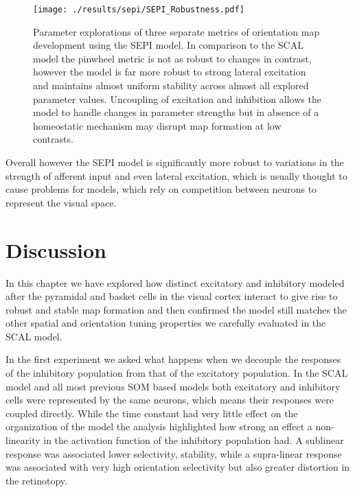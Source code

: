 \begin{figure}
	\centering
        \texttt{[image: ./results/sepi/SEPI\_Robustness.pdf]}
	\caption{Parameter explorations of three separate metrics of
          orientation map development using the SEPI model. In
          comparison to the SCAL model the pinwheel metric is not as
          robust to changes in contrast, however the model is far more
          robust to strong lateral excitation and maintains almost
          uniform stability across almost all explored parameter
          values. Uncoupling of excitation and inhibition allows the
          model to handle changes in parameter strengths but in
          absence of a homeostatic mechanism may disrupt map formation
          at low contrasts.}
	\label{SEPIStability}
\end{figure}

Overall however the SEPI model is significantly more robust to
variations in the strength of afferent input and even lateral
excitation, which is usually thought to cause problems for models,
which rely on competition between neurons to represent the visual
space.

\section{Discussion}

In this chapter we have explored how distinct excitatory and
inhibitory modeled after the pyramidal and basket cells in the visual
cortex interact to give rise to robust and stable map formation and
then confirmed the model still matches the other spatial and
orientation tuning properties we carefully evaluated in the SCAL
model.

In the first experiment we asked what happens when we decouple the
responses of the inhibitory population from that of the excitatory
population. In the SCAL model and all most previous SOM based models
both excitatory and inhibitory cells were represented by the same
neurons, which means their responses were coupled directly. While the
time constant had very little effect on the organization of the model
the analysis highlighted how strong an effect a non-linearity in the
activation function of the inhibitory population had. A sublinear
response was associated lower selectivity, stability, while a
supra-linear response was associated with very high orientation
selectivity but also greater distortion in the retinotopy.

